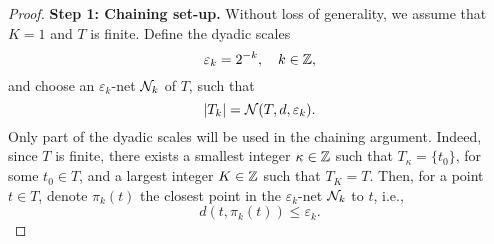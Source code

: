\begin{proof}
	\textbf{Step 1: Chaining set-up.} Without loss of generality, we assume that \(K=1\) and \(T\) is finite. Define the dyadic scales
	\begin{equation*}
		\varepsilon_{k}=2^{-k},\quad k\in\mathbb{Z},
	\end{equation*}
	and choose an \(\varepsilon_{k}\)-net \(\mathcal{N}_{k}\) of \(T\), such that
	\begin{equation*}
		|T_{k}|=\mathcal{N}(T,d,\varepsilon_{k}).
	\end{equation*}
	Only part of the dyadic scales will be used in the chaining argument. Indeed, since \(T\) is finite, there exists a smallest integer \(\kappa\in\mathbb{Z}\) such that \(T_{\kappa}=\{t_{0}\}\), for some \(t_{0}\in T\), and a largest integer \(K\in\mathbb{Z}\) such that \(T_{K}=T\). Then, for a point \(t\in T\), denote \(\pi_{k}(t)\) the closest point in the \(\varepsilon_{k}\)-net \(\mathcal{N}_{k}\) to \(t\), i.e.,
	\begin{equation*}
		d(t,\pi_{k}(t))\leq\varepsilon_{k}.
	\end{equation*}


\end{proof}
